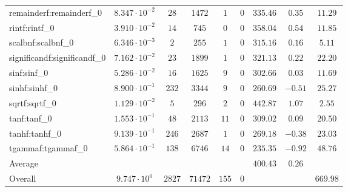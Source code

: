 \begin{tabular}{|l|c|c|c|c|c|c|c|c|}
remainderf:remainderf\_0     & $ 8.347 \cdot 10^{-2} $ & $ 28     $ & $ 1472  $ & $ 1   $ & $ 0   $ & $ 335.46      $ & $ 0.35    $ & $ 11.29   $ \\
rintf:rintf\_0               & $ 3.910 \cdot 10^{-2} $ & $ 14     $ & $ 745   $ & $ 0   $ & $ 0   $ & $ 358.04      $ & $ 0.54    $ & $ 11.85   $ \\
scalbnf:scalbnf\_0           & $ 6.346 \cdot 10^{-3} $ & $ 2      $ & $ 255   $ & $ 1   $ & $ 0   $ & $ 315.16      $ & $ 0.16    $ & $ 5.11    $ \\
significandf:significandf\_0 & $ 7.162 \cdot 10^{-2} $ & $ 23     $ & $ 1899  $ & $ 1   $ & $ 0   $ & $ 321.13      $ & $ 0.22    $ & $ 22.20   $ \\
sinf:sinf\_0                 & $ 5.286 \cdot 10^{-2} $ & $ 16     $ & $ 1625  $ & $ 9   $ & $ 0   $ & $ 302.66      $ & $ 0.03    $ & $ 11.69   $ \\
sinhf:sinhf\_0               & $ 8.900 \cdot 10^{-1} $ & $ 232    $ & $ 3344  $ & $ 9   $ & $ 0   $ & $ 260.69      $ & $ -0.51   $ & $ 25.27   $ \\
sqrtf:sqrtf\_0               & $ 1.129 \cdot 10^{-2} $ & $ 5      $ & $ 296   $ & $ 2   $ & $ 0   $ & $ 442.87      $ & $ 1.07    $ & $ 2.55    $ \\
tanf:tanf\_0                 & $ 1.553 \cdot 10^{-1} $ & $ 48     $ & $ 2113  $ & $ 11  $ & $ 0   $ & $ 309.02      $ & $ 0.09    $ & $ 20.50   $ \\
tanhf:tanhf\_0               & $ 9.139 \cdot 10^{-1} $ & $ 246    $ & $ 2687  $ & $ 1   $ & $ 0   $ & $ 269.18      $ & $ -0.38   $ & $ 23.03   $ \\
tgammaf:tgammaf\_0           & $ 5.864 \cdot 10^{-1} $ & $ 138    $ & $ 6746  $ & $ 14  $ & $ 0   $ & $ 235.35      $ & $ -0.92   $ & $ 48.76   $ \\
\hline
Average                      & $                     $ & $        $ & $       $ & $     $ & $     $ & $ 400.43      $ & $ 0.26    $ & $         $ \\
\hline
Overall                      & $ 9.747 \cdot 10^{0}  $ & $ 2827   $ & $ 71472 $ & $ 155 $ & $ 0   $ & $             $ & $         $ & $ 669.98  $ \\
\hline
\end{tabular}
